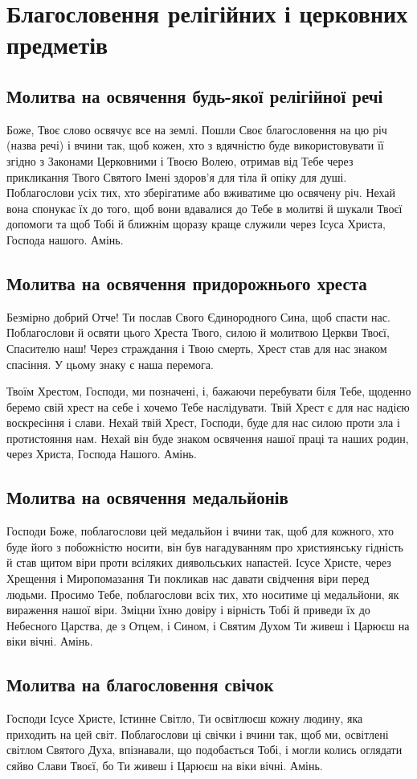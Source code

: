\documentclass[chapters.tex]{subfiles}
\begin{document}
\chapter{Благословення релігійних і церковних предметів}
\section{Молитва на освячення будь-якої релігійної речі}
Боже, Твоє слово освячує все на землі. Пошли Своє благословення на цю річ (назва речі) і вчини так, щоб кожен, хто з вдячністю буде використовувати її згідно з Законами Церковними і Твоєю Волею, отримав від Тебе через прикликання Твого Святого Імені здоров’я для тіла й опіку для душі. Поблагослови усіх тих, хто зберігатиме або вживатиме цю освячену річ. Нехай вона спонукає їх до того, щоб вони вдавалися до Тебе в молитві й шукали Твоєї допомоги та щоб Тобі й ближнім щоразу краще служили через Ісуса Христа, Господа нашого. Амінь.

\section{Молитва на освячення придорожнього хреста}
Безмірно добрий Отче! Ти послав Свого Єдинородного Сина, щоб спасти нас. Поблагослови й освяти цього Хреста Твого, силою й молитвою Церкви Твоєї, Спасителю наш! Через страждання і Твою смерть, Хрест став для нас знаком спасіння. У цьому знаку є наша перемога.

Твоїм Хрестом, Господи, ми позначені, і, бажаючи перебувати біля Тебе, щоденно беремо свій хрест на себе і хочемо Тебе наслідувати. Твій Хрест є для нас надією воскресіння і слави. Нехай твій Хрест, Господи, буде для нас силою проти зла і протистояння нам. Нехай він буде знаком освячення нашої праці та наших родин, через Христа, Господа Нашого. Амінь.

\section{Молитва на освячення медальйонів}
Господи Боже, поблагослови цей медальйон і вчини так, щоб для кожного, хто буде його з побожністю носити, він був нагадуванням про християнську гідність й став щитом віри проти всіляких диявольських напастей. Ісусе Христе, через Хрещення і Миропомазання Ти покликав нас давати свідчення віри перед людьми. Просимо Тебе, поблагослови всіх тих, хто носитиме ці медальйони, як вираження нашої віри. Зміцни їхню довіру і вірність Тобі й приведи їх до Небесного Царства, де з Отцем, і Сином, і Святим Духом Ти живеш і Царюєш на віки вічні. Амінь.

\section{Молитва на благословення свічок}
Господи Ісусе Христе, Істинне Світло, Ти освітлюєш кожну людину, яка приходить на цей світ. Поблагослови ці свічки і вчини так, щоб ми, освітлені світлом Святого Духа, впізнавали, що подобається Тобі, і могли колись оглядати сяйво Слави Твоєї, бо Ти живеш і Царюєш на віки вічні. Амінь.
\end{document}
